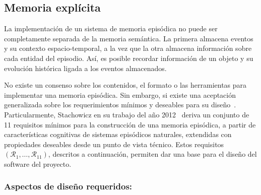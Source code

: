 \subsection{Memoria explícita}\label{sec:ltm_exp}

La implementación de un sistema de memoria episódica no puede ser completamente separada de la memoria semántica. La primera almacena eventos y su contexto espacio-temporal, a la vez que la otra almacena información sobre cada entidad del episodio. Así, es posible recordar información de un objeto y su evolución histórica ligada a los eventos almacenados.

No existe un consenso sobre los contenidos, el formato o las herramientas para implementar una memoria episódica\cite{ltm_in_robocup}. Sin embargo, si existe una aceptación generalizada sobre los requerimientos mínimos y deseables para su diseño~\cite{Vijayakumar2014,Ho2009,Jockel2008}. Particularmente, Stachowicz en su trabajo del año 2012~\cite{Stachowicz2012} deriva un conjunto de 11 requisitos mínimos para la construcción de una memoria episódica, a partir de características cognitivas de sistemas episódicos naturales, extendidas con propiedades deseables desde un punto de vista técnico. Estos requisitos $(\mathcal{R}_{1},\ldots,\mathcal{R}_{11})$, descritos a continuación, permiten dar una base para el diseño del software del proyecto.


\subsubsection{Aspectos de diseño requeridos:}


